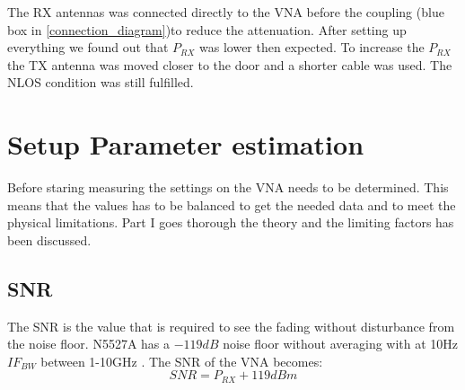 The RX antennas was connected directly to the VNA before the coupling (blue box in \autoref{connection_diagram})to reduce the attenuation. After setting up everything we found out that $P_{RX}$ was lower then expected. To increase the $P_{RX}$ the TX antenna was moved closer to the door and a shorter cable was used. The NLOS condition was still fulfilled. 

%
%


\chapter{Setup Parameter estimation}
Before staring measuring the settings on the VNA needs to be determined. This means that the values has to be  balanced to get the needed data and to meet the physical limitations. Part I goes thorough the theory and the limiting factors has been discussed.

\section{SNR}
The SNR is the value that is required to see the fading without disturbance from the noise floor. N5527A has a $-119dB$ noise floor without averaging with at 10Hz $IF_{BW}$ between 1-10GHz \citep{Key_PNA}. The \gls{SNR} of the VNA becomes:
\begin{equation}
SNR = P_{RX}+119dBm 
\label{NFvna}
\end{equation}

\begin{where}
\end{where}

